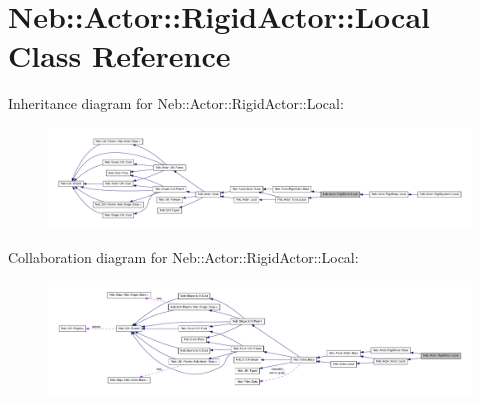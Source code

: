 \hypertarget{classNeb_1_1Actor_1_1RigidActor_1_1Local}{\section{\-Neb\-:\-:\-Actor\-:\-:\-Rigid\-Actor\-:\-:\-Local \-Class \-Reference}
\label{classNeb_1_1Actor_1_1RigidActor_1_1Local}
}


\-Inheritance diagram for \-Neb\-:\-:\-Actor\-:\-:\-Rigid\-Actor\-:\-:\-Local\-:\nopagebreak
\begin{figure}[H]
\begin{center}
\leavevmode
\includegraphics[width=350pt]{classNeb_1_1Actor_1_1RigidActor_1_1Local__inherit__graph}
\end{center}
\end{figure}


\-Collaboration diagram for \-Neb\-:\-:\-Actor\-:\-:\-Rigid\-Actor\-:\-:\-Local\-:\nopagebreak
\begin{figure}[H]
\begin{center}
\leavevmode
\includegraphics[width=350pt]{classNeb_1_1Actor_1_1RigidActor_1_1Local__coll__graph}
\end{center}
\end{figure}

